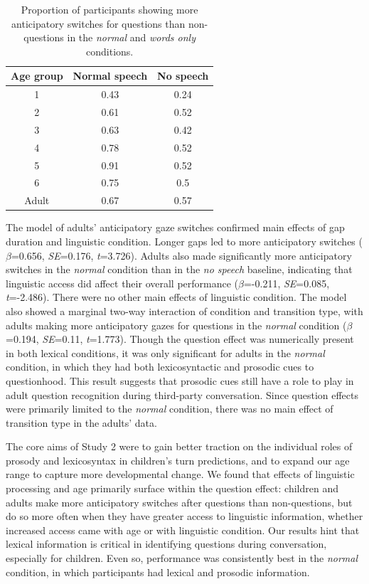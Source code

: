 \documentclass[authoryear, 12pt]{elsarticle}
\begin{document}
\begin{table}[ht]
\begin{center}
  \begin{tabular}{ccc}
    \hline
    Age group & Normal speech & No speech \\ 
    \hline
    1 & 0.43 & 0.24 \\
    2 & 0.61 & 0.52 \\
    3 & 0.63 & 0.42 \\
    4 & 0.78 & 0.52 \\
    5 & 0.91 & 0.52 \\
    6 & 0.75 & 0.5 \\
    Adult & 0.67 & 0.57 \\
    \hline
  \end{tabular}
\end{center}
  \caption{Proportion of participants showing more anticipatory switches for questions than non-questions in the \textit{normal} and \textit{words only} conditions.}
\label{questioneffectexp2}
\end{table}

The model of adults' anticipatory gaze switches confirmed main effects of gap duration and linguistic condition. Longer gaps led to more anticipatory switches (\textit{$\beta$}=0.656, \textit{SE}=0.176, \textit{t}=3.726). Adults also made significantly more anticipatory switches in the \textit{normal} condition than in the \textit{no speech} baseline, indicating that linguistic access did affect their overall performance (\textit{$\beta$}=-0.211, \textit{SE}=0.085, \textit{t}=-2.486). There were no other main effects of linguistic condition. The model also showed a marginal two-way interaction of condition and transition type, with adults making more anticipatory gazes for questions in the \textit{normal} condition (\textit{$\beta$}=0.194, \textit{SE}=0.11, \textit{t}=1.773). Though the question effect was numerically present in both lexical conditions, it was only significant for adults in the \textit{normal} condition, in which they had both lexicosyntactic and prosodic cues to questionhood. This result suggests that prosodic cues still have a role to play in adult question recognition during third-party conversation. Since question effects were primarily limited to the \textit{normal} condition, there was no main effect of transition type in the adults' data.

The core aims of Study 2 were to gain better traction on the individual roles of prosody and lexicosyntax in children's turn predictions, and to expand our age range to capture more developmental change. We found that effects of linguistic processing and age primarily surface within the question effect: children and adults make more anticipatory switches after questions than non-questions, but do so more often when they have greater access to linguistic information, whether increased access came with age or with linguistic condition. Our results hint that lexical information is critical in identifying questions during conversation, especially for children. Even so, performance was consistently best in the \textit{normal} condition, in which participants had lexical and prosodic information.
\end{document}
